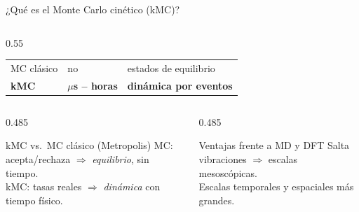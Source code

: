 \documentclass[aspectratio=169,11pt]{beamer}
\begin{document}
\begin{frame}{¿Qué es el Monte Carlo cinético (kMC)?}
\begin{columns}[c,onlytextwidth]
\begin{column}{0.55\textwidth}
\begin{tabular}{@{}lll@{}}
        MC clásico   & no                       & estados de equilibrio \\
        \textbf{kMC} & \textbf{$\mu$s -- horas} & \textbf{dinámica por eventos} \\
        \bottomrule
      \end{tabular}
    \end{column}
  \end{columns}
  \vspace{0.5em}
  \begin{columns}[T,onlytextwidth]
    \begin{column}{0.485\textwidth}
      \begin{block}{kMC vs.\ MC clásico (Metropolis)}
        \footnotesize MC: acepta/rechaza $\Rightarrow$ \emph{equilibrio}, sin tiempo.\\
        kMC: tasas reales $\Rightarrow$ \emph{dinámica} con tiempo físico.
      \end{block}
    \end{column}
    \begin{column}{0.485\textwidth}
      \begin{block}{Ventajas frente a MD y DFT}
        \footnotesize Salta vibraciones $\Rightarrow$ escalas mesoscópicas.\\
        Escalas temporales y espaciales más grandes.\\
      \end{block}
    \end{column}
  \end{columns}
\end{frame}
\end{document}
